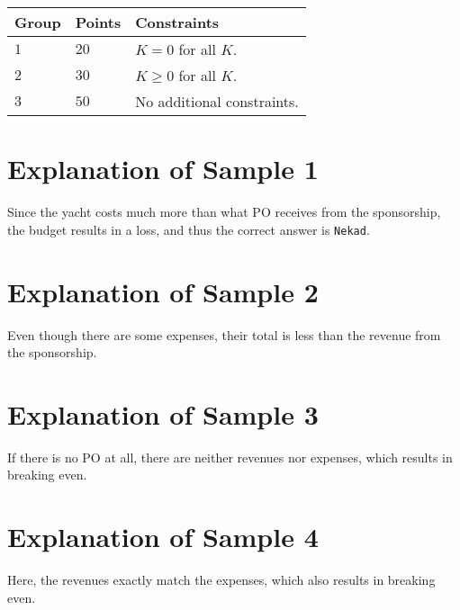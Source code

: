 \noindent
\begin{tabular}{| l | l | p{12cm} |}
  \hline
  \textbf{Group} & \textbf{Points} & \textbf{Constraints} \\ \hline
  $1$    & $20$       & $K = 0$ for all $K$. \\ \hline 
  $2$    & $30$       & $K \geq 0$ for all $K$. \\ \hline
  $3$    & $50$       & No additional constraints. \\ \hline
\end{tabular}

\section*{Explanation of Sample 1}  
Since the yacht costs much more than what PO receives from the sponsorship, the budget results in a loss, and thus the correct answer is \texttt{Nekad}.  

\section*{Explanation of Sample 2}  
Even though there are some expenses, their total is less than the revenue from the sponsorship.  

\section*{Explanation of Sample 3}  
If there is no PO at all, there are neither revenues nor expenses, which results in breaking even.  

\section*{Explanation of Sample 4}  
Here, the revenues exactly match the expenses, which also results in breaking even. 
